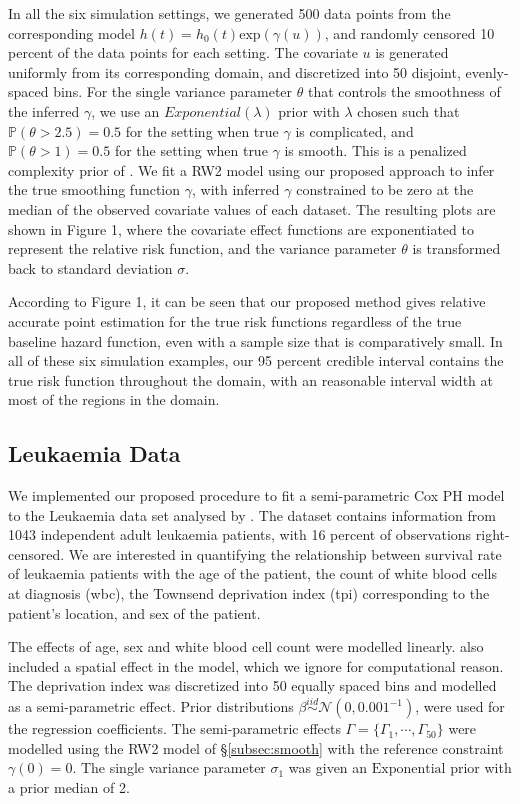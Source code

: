 \documentclass[ba]{imsart}
\begin{document}
In all the six simulation settings, we  generated 500 data points from the corresponding model $h(t) = h_{0}(t) \text{exp}(\gamma(u))$, and randomly censored 10 percent of the data points for each setting. The covariate $u$ is generated uniformly from its corresponding domain, and discretized into 50 disjoint, evenly-spaced bins. For the single variance parameter $\theta$ that controls the smoothness of the inferred $\gamma$, we use an $Exponential(\lambda)$ prior with $\lambda$ chosen such that $\mathbb{P}\left( \theta > 2.5\right) = 0.5$ for the setting when true $\gamma$ is complicated, and $\mathbb{P}\left( \theta > 1\right) = 0.5$ for the setting when true $\gamma$ is smooth. This is a penalized complexity prior of \cite{pcprior}. We fit a RW2 model using our proposed approach to infer the true smoothing function $\gamma$, with inferred $\gamma$ constrained to be zero at the median of the observed covariate values of each dataset. The resulting plots are shown in Figure 1, where the covariate effect functions are exponentiated to represent the relative risk function, and the variance parameter $\theta$ is transformed back to standard deviation $\sigma$.

According to Figure 1, it can be seen that our proposed method gives relative accurate point estimation for the true risk functions regardless of the true baseline hazard function, even with a sample size that is comparatively small. In all of these six simulation examples, our 95 percent credible interval contains the true risk function throughout the domain, with an reasonable interval width at most of the regions in the domain. 

\subsection{Leukaemia Data}\label{subsec:leuk}

We implemented our proposed procedure to fit a semi-parametric Cox PH model to the Leukaemia data set analysed by \cite{inlacoxph}. The dataset contains information from 1043 independent adult leukaemia patients, with 16 percent of observations right-censored. We are interested in quantifying the relationship between survival rate of leukaemia patients with the age of the patient, the count of white blood cells at diagnosis (wbc), the Townsend deprivation index (tpi) corresponding to the patient's location, and sex of the patient.

The effects of age, sex and white blood cell count were modelled linearly. \cite{inlacoxph} also included a spatial effect in the model, which we ignore for computational reason. The deprivation index was discretized into 50 equally spaced bins and modelled as a semi-parametric effect. Prior distributions $\beta \stackrel{iid}{\sim} \mathcal{N}(0, 0.001^{-1})$, were used for the regression coefficients. The semi-parametric effects $\Gamma = \{\Gamma_{1}, \cdots, \Gamma_{50}\}$ were modelled using the RW2 model of \S\ref{subsec:smooth} with the reference constraint $\gamma(0) = 0$. The single variance parameter $\sigma_{1}$ was given an $\text{Exponential}$ prior with a prior median of 2. 
\end{document}
